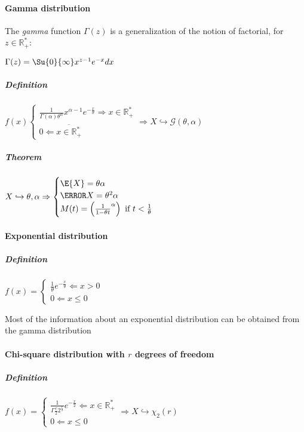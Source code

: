 \paragraph{Gamma distribution}
The \emph{gamma} function $\Gamma(z)$ is a generalization of the notion of 
factorial, for $z\in\mathbb{R}_{+}^{*}$:\\
\begin{center}
	$\Gamma(z)=\Su{0}{\infty}x^{z-1}e^{-x}dx$
\end{center}
\subparagraph{Definition}

\begin{center}
	$f(x)\begin{cases}\frac{1}{\Gamma(\alpha)\theta^{\alpha}}x^{\alpha-1}e^{-\frac{x}{\theta}}\Rightarrow x\in\mathbb{R}_{+}^{*}\\0 \Leftarrow \overline{x\in\mathbb{R}_{+}^{*}}\end{cases}\Rightarrow X\hookrightarrow \mathcal{G}(\theta, \alpha)$
\end{center}
\subparagraph{Theorem}
$X\hookrightarrow\mathcal{\theta, \alpha}\Rightarrow
\begin{cases}
	\E{X}=\theta\alpha\\
	\V{X}=\theta^{2}\alpha\\
	M(t)=\left( \frac{1}{1-\theta t}^{\alpha}\right)\text{ if }t<\frac{1}{\theta} 
\end{cases}
$
\paragraph{Exponential distribution}
\subparagraph{Definition}
\begin{center}
	$f(x)=
	\begin{cases}
		\frac{1}{\theta}e^{-\frac{x}{\theta}}\Leftarrow x >0\\
		0\Leftarrow x\leq 0
	\end{cases}$
\end{center}
Most of the information about an exponential distribution can be obtained 
from the gamma distribution
\paragraph{Chi-square distribution with $r$ degrees of freedom}
\subparagraph{Definition}
\begin{center}
	$f(x)=
	\begin{cases}
		\frac{1}{\Gamma{\frac{r}{2}}2^{\frac{r}{2}}}e^{-\frac{x}{2}}\Leftarrow x\in\mathbb{R}_{+}^{*}\\
		0\Leftarrow x\leq 0
	\end{cases} \Rightarrow X\hookrightarrow \chi_{2}(r)$
\end{center}
